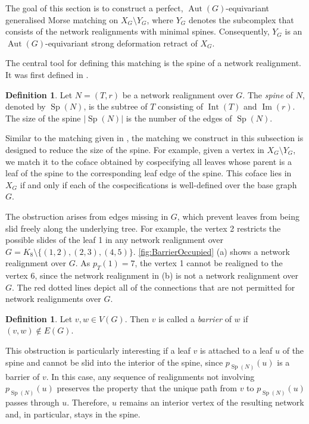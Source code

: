 \documentclass[reqno,dvipsnames]{amsart}
\theoremstyle{plain}
\numberwithin{equation}{section}
\theoremstyle{definition}
\newtheorem{definition}[theorem]{Definition}
\DeclareMathOperator{\Image}{Im}
\DeclareMathOperator{\Int}{Int}
\DeclareMathOperator{\Sp}{Sp}
\DeclareMathOperator{\Aut}{Aut}
\begin{document}
The goal of this section is to construct a perfect, $\Aut(G)$-equivariant generalised Morse matching on $X_G\setminus Y_G$, where $Y_G$ denotes the subcomplex that consists of the network realignments with minimal spines. Consequently, $Y_G$ is an $\Aut(G)$-equivariant strong deformation retract of $X_G$.

The central tool for defining this matching is the spine of a network realignment. It was first defined in \cite{Kozlov25}.

\begin{definition}
	Let $N = (T,r)$ be a network realignment over $G$. The \textit{spine} of $N$, denoted by $\Sp(N)$, is the subtree of $T$ consisting of $\Int(T)$ and $\Image(r)$. The size of the spine $|\Sp(N)|$ is the number of the edges of $\Sp(N)$.
\end{definition}

Similar to the matching given in \cite{Kozlov25}, the matching we construct in this subsection is designed to reduce the size of the spine. For example, given a vertex in $X_G\setminus Y_G$, we match it to the coface obtained by cospecifying all leaves whose parent is a leaf of the spine to the corresponding leaf edge of the spine. This coface lies in $X_G$ if and only if each of the cospecifications is well-defined over the base graph $G$. 

The obstruction arises from edges missing in $G$, which prevent leaves from being slid freely along the underlying tree. For example, the vertex 2 restricts the possible slides of the leaf 1 in any network realignment over $G = K_8 \setminus \{(1,2),(2,3),(4,5)\}$. \autoref{fig:BarrierOccupied} (a) shows a network realignment over $G$. As $p_T(1) = 7$, the vertex 1 cannot be realigned to the vertex 6, since the network realignment in (b) is not a network realignment over $G$. The red dotted lines depict all of the connections that are not permitted for network realignments over $G$.

\begin{definition}
	Let $v,w \in V(G)$. Then $v$ is called a \textit{barrier} of $w$ if $(v,w) \notin E(G)$.
\end{definition}

This obstruction is particularly interesting if a leaf $v$ is attached to a leaf $u$ of the spine and cannot be slid into the interior of the spine, since $p_{\Sp(N)}(u)$ is a barrier of $v$. In this case, any sequence of realignments not involving $p_{\Sp(N)}(u)$ preserves the property that the unique path from $v$ to $p_{\Sp(N)}(u)$ passes through $u$. Therefore, $u$ remains an interior vertex of the resulting network and, in particular, stays in the spine. 
\end{document}
